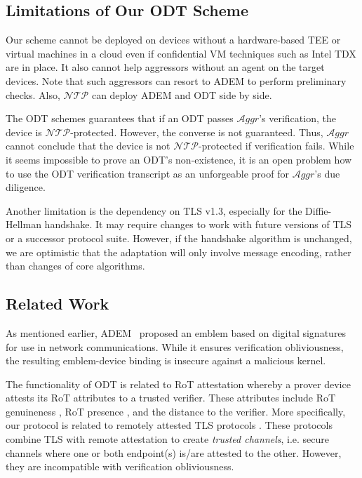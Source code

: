 \documentclass[letterpaper,twocolumn,10pt]{article}
\newcommand{\T}{\ensuremath{\mathcal{A}ggr}\xspace}
\newcommand{\N}{\ensuremath{\mathcal{N\!T}\mathcal{\!P}}\xspace}
\begin{document}
\subsection{Limitations of Our ODT Scheme}
\label{sec:limitations}
%
Our scheme cannot be deployed on devices without a hardware-based TEE or virtual machines in a cloud even
if confidential VM techniques such as Intel TDX are in place.
It also cannot help aggressors without an agent on the target devices.
Note that such aggressors can resort to ADEM \cite{adem} to perform preliminary checks.
Also, \N can deploy ADEM and ODT side by side.

The ODT schemes guarantees that if an ODT passes \T's verification, the device is \N-protected.
However, the converse is not guaranteed. Thus, \T cannot conclude that the device is not \N-protected
if verification fails. While it seems impossible to prove an ODT's non-existence, it is an open problem
how to use the ODT verification transcript as an unforgeable proof for \T's due diligence.

Another limitation is the dependency on TLS v1.3, especially for the Diffie-Hellman handshake.
It may require changes to work with future versions of TLS or a successor protocol suite. However,
if the handshake algorithm is unchanged, we are optimistic that the adaptation will only involve message
encoding, rather than changes of core algorithms.


\subsection{Related Work}
%
As mentioned earlier, ADEM~\cite{adem} proposed an emblem based on digital signatures for use in network
communications. While it ensures verification obliviousness, the resulting emblem-device binding is
insecure against a malicious kernel.

The functionality of ODT is related to RoT attestation whereby a prover device attests its RoT attributes
to a trusted verifier. These attributes include RoT genuineness \cite{tpm,dcap}, RoT presence \cite{presence_att},
and the distance \cite{CRSC12,dhar2020proximitee} to the verifier.
More specifically, our protocol is related to remotely attested TLS protocols \cite{TC4SE,RATLS,IntelRA-TLS,TSL}.
These protocols combine TLS with remote attestation to create \emph{trusted channels}, i.e. secure channels
where one or both endpoint(s) is/are attested to the other. However, they are incompatible with
verification obliviousness.
\end{document}
